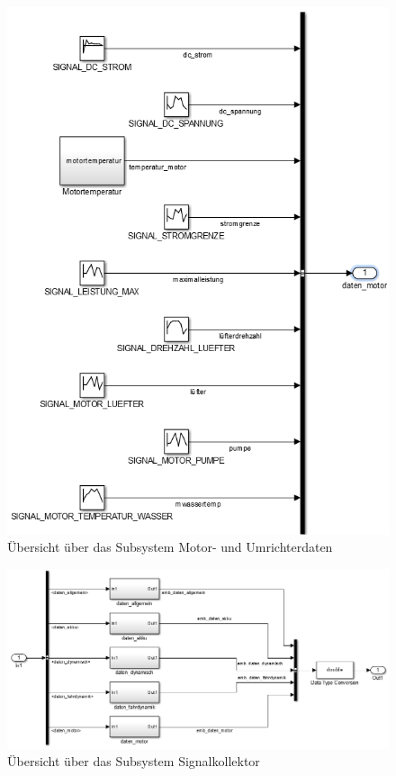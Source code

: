 \documentclass[fontsize = 12pt, paper = a4]{scrreprt}
\begin{document}
\newpage

\begin{figure}[h]
\centering
\includegraphics[scale = 1]{submotordaten}
\caption[Subsystem Motor- und Umrichterdaten]{Übersicht über das Subsystem Motor- und Umrichterdaten}
\label{submotordaten}
\end{figure} 

\newpage

\begin{figure}
\centering
\includegraphics[scale = 0.85]{subsignalkollektor}
\caption[Übersicht über das Subsystem Signalkollektor]{Übersicht über das Subsystem Signalkollektor}
\label{subsignalkollektor}
\end{figure}
\end{document}
